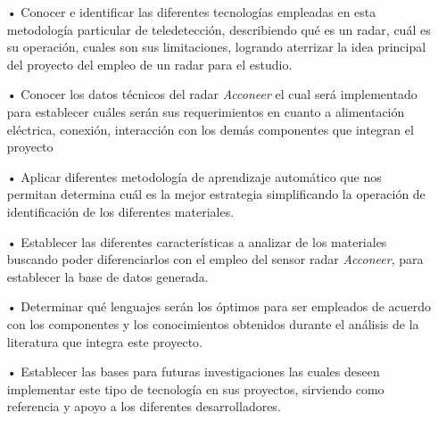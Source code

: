\begin{itemize}
\item[•] Conocer e identificar las diferentes tecnologías empleadas en esta metodología particular de teledetección, describiendo qué es un radar, cuál es su operación, cuales son sus limitaciones, logrando aterrizar la idea principal del proyecto del empleo de un radar para el estudio.

\item[•] Conocer los datos técnicos del radar \textit{Acconeer} el cual será implementado para establecer cuáles serán sus requerimientos en cuanto a alimentación eléctrica, conexión, interacción con los demás componentes que integran el proyecto

\item[•] Aplicar diferentes metodología de aprendizaje automático que nos permitan determina cuál es la mejor estrategia simplificando la operación de identificación de los diferentes materiales.

\item[•] Establecer las diferentes características a analizar de los materiales buscando poder diferenciarlos con el empleo del sensor radar \textit{Acconeer}, para establecer la base de datos generada.

\item[•] Determinar qué lenguajes serán los óptimos para ser empleados de acuerdo con los componentes y los conocimientos obtenidos durante el análisis de la literatura que integra este proyecto.


\item[•] Establecer las bases para futuras investigaciones las cuales deseen implementar este tipo de tecnología en sus proyectos, sirviendo como referencia y apoyo a los diferentes desarrolladores.

\end{itemize}